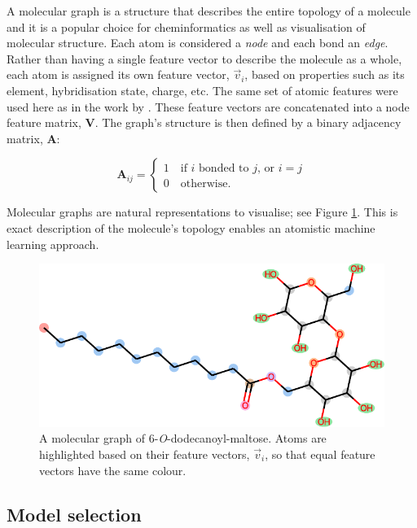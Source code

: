 A molecular graph is a structure that describes the entire topology of a
molecule and it is a popular choice for cheminformatics as well as visualisation
of molecular structure. Each atom is considered a \emph{node} and each bond an
\emph{edge}. Rather than having a single feature vector to describe the molecule
as a whole, each atom is assigned its own feature vector, $\vec{v}_i$, based on
properties such as its element, hybridisation state, charge, etc. The same set
of atomic features were used here as in the work by
\citet{qinPredictingCriticalMicelle2021}. These feature vectors are concatenated
into a node feature matrix, $\mathbf{V}$. The graph's structure is then defined
by a binary adjacency matrix, $\mathbf{A}$:

\begin{equation}
    \label{eq:adjacency-mat}
    \mathbf{A}_{ij} = \begin{cases}
        1 \quad \text{if } i \text { bonded to } j \text{, or } i = j \\
        0 \quad \text{otherwise.}
    \end{cases}
\end{equation}

Molecular graphs are natural representations to visualise; see Figure \ref{fig:mol-graph}. This is exact description of the molecule's topology enables an atomistic machine learning approach.

\begin{figure}
    \centering
    \includegraphics[width=.8\linewidth]{images/molecular-graph.pdf}
    \caption{A molecular graph of 6-\textit{O}-dodecanoyl-maltose. Atoms are
        highlighted based on their feature vectors, $\vec{v}_i$, so that equal
        feature vectors have the same colour.}
    \label{fig:mol-graph}
\end{figure}

\subsection{Model selection}

